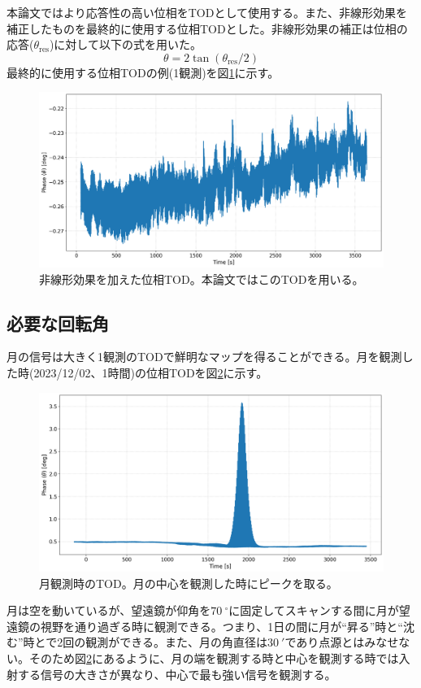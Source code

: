 本論文ではより応答性の高い位相をTODとして使用する。また、非線形効果を補正したものを最終的に使用する位相TODとした。非線形効果の補正は位相の応答($\theta_{\mathrm{res}}$)に対して以下の式\cite{sueno_doctor}を用いた。
\begin{equation}
  \theta = 2\tan(\theta_{\mathrm{res}}/2)
\end{equation}
最終的に使用する位相TODの例(1観測)を図\ref{raw_phase}に示す。
\begin{figure}[htbp]
  \centering
  \includegraphics[width=0.9\columnwidth]{5_alignment/figs/raw_phase_deg.png}
  \caption{非線形効果を加えた位相TOD。本論文ではこのTODを用いる。}
  \label{raw_phase}
\end{figure}

\subsection{必要な回転角}
\label{angle_calculation}
月の信号は大きく1観測のTODで鮮明なマップを得ることができる。月を観測した時(2023/12/02、1時間)の位相TODを図\ref{6550_kid0_phase}に示す。
\begin{figure}[htbp]
  \centering
  \includegraphics[width=0.85\columnwidth]{5_alignment/figs/6550_kid0_phase.png}
  \caption{月観測時のTOD。月の中心を観測した時にピークを取る。}
  \label{6550_kid0_phase}
\end{figure}
月は空を動いているが、望遠鏡が仰角を$\SI{70}{^{\circ}}$に固定してスキャンする間に月が望遠鏡の視野を通り過ぎる時に観測できる。つまり、1日の間に月が``昇る''時と``沈む''時とで2回の観測ができる。また、月の角直径は$\SI{30}{'}$であり点源とはみなせない。そのため図\ref{6550_kid0_phase}にあるように、月の端を観測する時と中心を観測する時では入射する信号の大きさが異なり、中心で最も強い信号を観測する。

